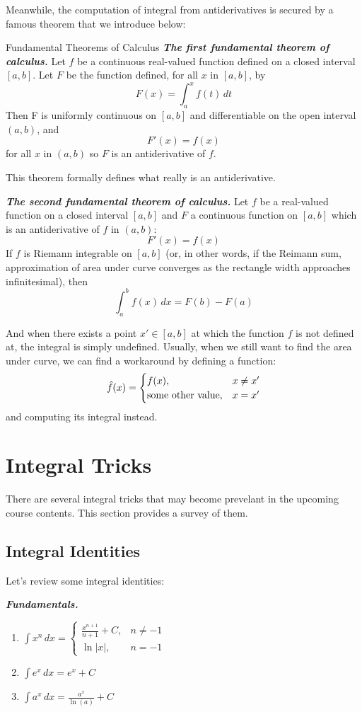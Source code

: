 Meanwhile, the computation of integral from antiderivatives is secured by a famous theorem that we introduce below:
\begin{ln-theorem}{Fundamental Theorems of Calculus}{}
    \textit{\textbf{The first fundamental theorem of calculus.}}
    Let $f$ be a continuous real-valued function defined on a closed interval $[a, b]$. Let $F$ be the function defined, for all $x$ in $[a, b]$, by
    \[
        F(x)=\int_{a}^{x}f(t)\,dt
    \]
    Then F is uniformly continuous on $[a, b]$ and differentiable on the open interval $(a, b)$, and
    \[
        F'(x)=f(x)
    \]
    for all $x$ in $(a, b)$ so $F$ is an antiderivative of $f$.

    This theorem formally defines what really is an antiderivative.


    \textit{\textbf{The second fundamental theorem of calculus.}}
    Let $f$ be a real-valued function on a closed interval $[a,b]$ and $F$ a continuous function on $[a,b]$ which is an antiderivative of $f$ in $(a,b)$:
    \[
        F'(x)=f(x)
    \]
    If $f$ is Riemann integrable on $[a,b]$ (or, in other words, if the Reimann sum, approximation of area under curve converges as the rectangle width approaches infinitesimal), then
    \[
        \int _{a}^{b}f(x)\,dx=F(b)-F(a)
    \]
\end{ln-theorem}

And when there exists a point $x' \in [a, b]$ at which the function $f$ is not defined at, the integral is simply undefined.
Usually, when we still want to find the area under curve, we can find a workaround by defining a function:
\[
    \hat{f}(x) = \begin{cases}
        f(x), &x \neq x' \\
        {\rm some\ other\ value}, &x = x'
    \end{cases}
\]
and computing its integral instead.

\section{Integral Tricks}
There are several integral tricks that may become prevelant in the upcoming course contents.
This section provides a survey of them.

\subsection{Integral Identities}
Let's review some integral identities:

\textbf{\textit{Fundamentals.}}
\begin{enumerate}
    \item $\int x^n \,dx = \begin{cases} \frac{x^{n+1}}{n+1} + C, &n \neq -1 \\ \ln{|x|}, &n = -1 \end{cases}$
    \item $\int e^x \,dx = e^x + C$
    \item $\int a^x \,dx = \frac{a^x}{\ln(a)} + C$
\end{enumerate}


